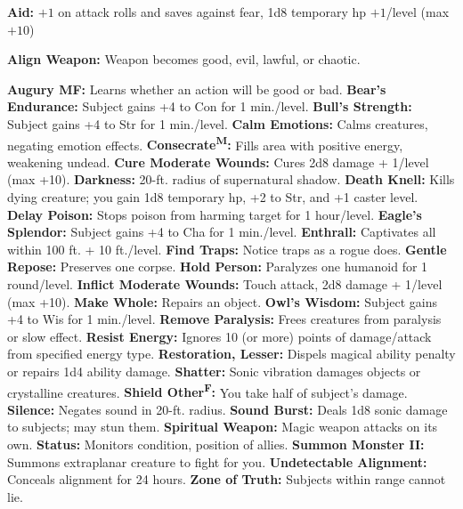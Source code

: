 \documentclass{spelllist}
\begin{document}
  \begin{flushleft}
    \textbf{Aid:} $+1$ on attack rolls and saves against fear, 1d8 temporary hp $+1$/level (max $+10$)
    
    \textbf{Align Weapon:} Weapon becomes good, evil, lawful, or chaotic.
    
    \textbf{Augury MF:} Learns whether an action will be good or bad.
    \textbf{Bear’s Endurance:} Subject gains +4 to Con for 1 min./level.
    \textbf{Bull’s Strength:} Subject gains +4 to Str for 1 min./level.
    \textbf{Calm Emotions:} Calms creatures, negating emotion effects.
    \textbf{Consecrate\textsuperscript{M}:} Fills area with positive energy, weakening undead.
    \textbf{Cure Moderate Wounds:} Cures 2d8 damage + 1/level (max +10).
    \textbf{Darkness:} 20-ft. radius of supernatural shadow.
    \textbf{Death Knell:} Kills dying creature; you gain 1d8 temporary
    hp, +2 to Str, and +1 caster level.
    \textbf{Delay Poison:} Stops poison from harming target for 1 hour/level.
    \textbf{Eagle’s Splendor:} Subject gains +4 to Cha for 1 min./level.
    \textbf{Enthrall:} Captivates all within 100 ft. + 10 ft./level.
    \textbf{Find Traps:} Notice traps as a rogue does.
    \textbf{Gentle Repose:} Preserves one corpse.
    \textbf{Hold Person:} Paralyzes one humanoid for 1 round/level.
    \textbf{Inflict Moderate Wounds:} Touch attack, 2d8 damage + 1/level
    (max +10).
    \textbf{Make Whole:} Repairs an object.
    \textbf{Owl’s Wisdom:} Subject gains +4 to Wis for 1 min./level.
    \textbf{Remove Paralysis:} Frees creatures from paralysis or slow effect.
    \textbf{Resist Energy:} Ignores 10 (or more) points of damage/attack
    from specified energy type.
    \textbf{Restoration, Lesser:} Dispels magical ability penalty or
    repairs 1d4 ability damage.
    \textbf{Shatter:} Sonic vibration damages objects or crystalline
    creatures.
    \textbf{Shield Other\textsuperscript{F}:} You take half of subject’s damage.
    \textbf{Silence:} Negates sound in 20-ft. radius.
    \textbf{Sound Burst:} Deals 1d8 sonic damage to subjects; may stun them.
    \textbf{Spiritual Weapon:} Magic weapon attacks on its own.
    \textbf{Status:} Monitors condition, position of allies.
    \textbf{Summon Monster II:} Summons extraplanar creature to
    fight for you.
    \textbf{Undetectable Alignment:} Conceals alignment for 24 hours.
    \textbf{Zone of Truth:} Subjects within range cannot lie.
    
  \end{flushleft}
  
\end{document}
